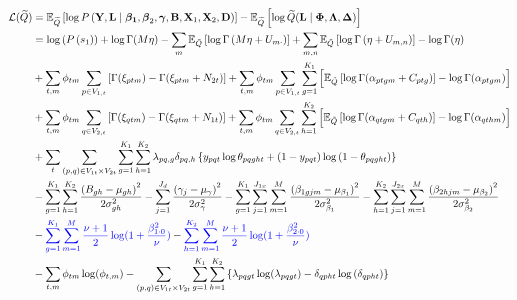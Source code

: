 \documentclass{article}
\begin{document}
\begin{equation} \label{eqn8}
\begin{aligned}
    \mathcal{L}(\widetilde{Q}) &= \mathbb{E}_{\widetilde{Q}}\left[ \log P \left( \mathbf{Y}, \mathbf{L} \mid \boldsymbol{\beta_1}, \boldsymbol{\beta}_2, \boldsymbol{\gamma}, \mathbf{B}, \mathbf{X}_1, \mathbf{X}_2, \mathbf{D}\right) \right] - \mathbb{E}_{\widetilde{Q}}\left[ \log \widetilde{Q}(\mathbf{L} \mid \boldsymbol{\Phi}, \boldsymbol{\Lambda}, \boldsymbol{\Delta}) \right] \\
    &= \log \left(P\left(s_{1}\right)\right)+\log \Gamma(M \eta)-\sum_{m} \mathbb{E}_{\tilde{Q}}\left[\log \Gamma\left(M \eta+U_{m\cdot}\right)\right]+\sum_{m, n} \mathbb{E}_{\tilde{Q}}\left[\log \Gamma\left(\eta+U_{m, n}\right)\right]-\log \Gamma(\eta)\\
    & + \sum_{t, m}\phi_{tm} \sum_{p \in V_{1,t}} \left[ \Gamma(\xi_{ptm}) -  \Gamma(\xi_{ptm} + N_{2t}) \right] +  \sum_{t, m}\phi_{tm} \sum_{p \in V_{1,t}} \sum_{g=1}^{K_1} \left[ \mathbb{E}_{\tilde{Q}}\left[\log \Gamma(\alpha_{ptgm} + C_{ptg}) \right] - \log \Gamma(\alpha_{ptgm}) \right]\\
    & + \sum_{t, m}\phi_{tm} \sum_{q \in V_{2,t}} \left[ \Gamma(\xi_{qtm}) -  \Gamma(\xi_{qtm} + N_{1t}) \right] +  \sum_{t, m}\phi_{tm} \sum_{q \in V_{2,t}} \sum_{h=1}^{K_2} \left[ \mathbb{E}_{\tilde{Q}}\left[\log \Gamma(\alpha_{qtgm} + C_{qth}) \right] - \log \Gamma(\alpha_{qthm}) \right] \\
    & +\sum_{t}\sum_{(p, q) \in V_{1t} \times V_{2t}} \sum_{g=1}^{K_{1}} \sum_{h=1}^{K_{2}} \lambda_{p q, g} \delta_{p q, h}\left\{y_{p q t} \log \theta_{p q g h t}+\left(1-y_{p q t}\right) \log \left(1-\theta_{p q g h t}\right)\right\} \\
    &-\sum_{g=1}^{K_1} \sum_{h=1}^{K_2} \frac{\left(B_{g h}-\mu_{g h}\right)^{2}}{2 \sigma_{g h}^{2}}-\sum_{j=1}^{J_{d}} \frac{\left(\gamma_{j}-\mu_{\gamma}\right)^{2}}{2 \sigma_{\gamma}^{2}}-\sum_{g=1}^{K_{1}} \sum_{j=1}^{J_{1 x}} \sum_{m=1}^M \frac{\left(\beta_{1 g j m}-\mu_{\beta_{1}}\right)^{2}}{2 \sigma_{\beta_{1}}^{2}}-\sum_{h=1}^{K_{2}} \sum_{j=1}^{J_{2 x}} \sum_{m=1}^M \frac{\left(\beta_{2 h j m}-\mu_{\beta_{2}}\right)^{2}}{2 \sigma_{\beta_{2}}^{2}} \\ 
    & - \textcolor{blue}{\sum_{g=1}^{K_{1}} \sum_{m=1}^M \frac{\nu + 1}{2} \log(1 + \frac{\beta_{1\cdot 0}^2}{\nu})} - \textcolor{blue}{\sum_{h=1}^{K_{2}} \sum_{m=1}^M \frac{\nu + 1}{2} \log(1 + \frac{\beta_{2\cdot 0}^2}{\nu})} \\
    &- \sum_{t,m} \phi_{tm} \log(\phi_{t,m})  - \sum_{(p, q) \in V_{1t} \times V_{2t}} \sum_{g=1}^{K_{1}} \sum_{h=1}^{K_{2}}\left\{\lambda_{p q g t} \log (\lambda_{p q g t})-\delta_{q p h t} \log \left(\delta_{q p h t}\right)\right\} 
\end{aligned}
\end{equation}
\end{document}
